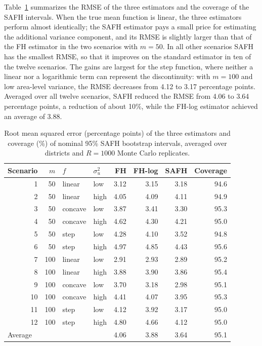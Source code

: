 Table~\ref{tab:sim} summarizes the RMSE of the three estimators and the coverage
of the SAFH intervals. When the true mean function is linear, the three
estimators perform almost identically; the SAFH estimator pays a small price for
estimating the additional variance component, and its RMSE is slightly larger
than that of the FH estimator in the two scenarios with $m = 50$. In all other
scenarios SAFH has the smallest RMSE, so that it improves on the standard
estimator in ten of the twelve scenarios. The gains are largest for the step
function, where neither a linear nor a logarithmic term can represent the
discontinuity: with $m = 100$ and low area-level variance, the RMSE decreases
from 4.12 to 3.17 percentage points. Averaged over all twelve scenarios, SAFH
reduced the RMSE from 4.06 to 3.64 percentage points, a reduction of about 10\%,
while the FH-log estimator achieved an average of 3.88.

\begin{table}[t]
\centering
\caption{Root mean squared error (percentage points) of the three estimators
and coverage (\%) of nominal 95\% SAFH bootstrap intervals, averaged over
districts and $R = 1000$ Monte Carlo replicates.}
\label{tab:sim}
\begin{tabular}{rrllrrrr}
\toprule
Scenario & $m$ & $f$ & $\sigma_u^2$ & FH & FH-log & SAFH & Coverage \\
\midrule
1  & 50  & linear  & low  & 3.12 & 3.15 & 3.18 & 94.6 \\
2  & 50  & linear  & high & 4.05 & 4.09 & 4.11 & 94.9 \\
3  & 50  & concave & low  & 3.87 & 3.41 & 3.30 & 95.3 \\
4  & 50  & concave & high & 4.62 & 4.30 & 4.21 & 95.0 \\
5  & 50  & step    & low  & 4.28 & 4.10 & 3.52 & 94.8 \\
6  & 50  & step    & high & 4.97 & 4.85 & 4.43 & 95.6 \\
7  & 100 & linear  & low  & 2.91 & 2.93 & 2.89 & 95.2 \\
8  & 100 & linear  & high & 3.88 & 3.90 & 3.86 & 95.4 \\
9  & 100 & concave & low  & 3.70 & 3.18 & 2.98 & 95.1 \\
10 & 100 & concave & high & 4.41 & 4.07 & 3.95 & 95.3 \\
11 & 100 & step    & low  & 4.12 & 3.92 & 3.17 & 95.0 \\
12 & 100 & step    & high & 4.80 & 4.66 & 4.12 & 95.0 \\
\midrule
\multicolumn{4}{l}{Average} & 4.06 & 3.88 & 3.64 & 95.1 \\
\bottomrule
\end{tabular}
\end{table}

